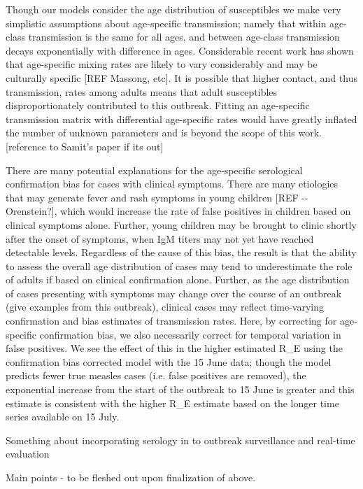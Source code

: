 Though our models consider the age distribution of susceptibles we make
very simplistic assumptions about age-specific transmission; namely that
within age-class transmission is the same for all ages, and between
age-class transmission decays exponentially with difference in ages.
Considerable recent work has shown that age-specific mixing rates are
likely to vary considerably and may be culturally specific {[}REF
Massong, etc{]}. It is possible that higher contact, and thus
transmission, rates among adults means that adult susceptibles
disproportionately contributed to this outbreak. Fitting an age-specific
transmission matrix with differential age-specific rates would have
greatly inflated the number of unknown parameters and is beyond the
scope of this work. {[}reference to Samit's paper if its out{]}

There are many potential explanations for the age-specific serological
confirmation bias for cases with clinical symptoms. There are many
etiologies that may generate fever and rash symptoms in young children
{[}REF -\/- Orenstein?{]}, which would increase the rate of false
positives in children based on clinical symptoms alone. Further, young
children may be brought to clinic shortly after the onset of symptoms,
when IgM titers may not yet have reached detectable levels. Regardless
of the cause of this bias, the result is that the ability to assess the
overall age distribution of cases may tend to underestimate the role of
adults if based on clinical confirmation alone. Further, as the age
distribution of cases presenting with symptoms may change over the
course of an outbreak (give examples from this outbreak), clinical cases
may reflect time-varying confirmation and bias estimates of transmission
rates. Here, by correcting for age-specific confirmation bias, we also
necessarily correct for temporal variation in false positives. We see
the effect of this in the higher estimated R\_E using the confirmation
bias corrected model with the 15 June data; though the model predicts
fewer true measles cases (i.e. false positives are removed), the
exponential increase from the start of the outbreak to 15 June is
greater and this estimate is consistent with the higher R\_E estimate
based on the longer time series available on 15 July.

Something about incorporating serology in to outbreak surveillance and
real-time evaluation

Main points - to be fleshed out upon finalization of above.


